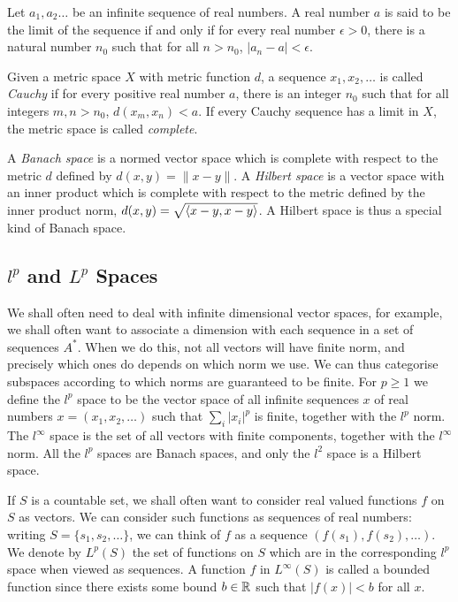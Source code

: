 \begin{defn}[Limit]
Let $a_1,a_2\ldots$ be an infinite sequence of real numbers. A real number $a$ is said to be the limit of the sequence if and only if for every real number $\epsilon > 0$, there is a natural number $n_0$ such that for all $n > n_0$, $|a_n - a| < \epsilon$.
\end{defn}

\begin{defn}[Completeness]
Given a metric space $X$ with metric function $d$, a sequence $x_1, x_2, \ldots$ is called \emph{Cauchy} if for every positive real number $a$, there is an integer $n_0$ such that for all integers $m,n > n_0$, $d(x_m,x_n) < a$. If every Cauchy sequence has a limit in $X$, the metric space is called \emph{complete}.

A \emph{Banach space} is a normed vector space which is complete with respect to the metric $d$ defined by $d(x,y) = \|x - y\|$. A \emph{Hilbert space} is a vector space with an inner product which is complete with respect to the metric defined by the inner product norm, $d(x,y) = \sqrt{\langle x-y, x-y \rangle}$. A Hilbert space is thus a special kind of Banach space.
\end{defn}

\subsection{$l^p$ and $L^p$ Spaces}
\label{lp-space-section}

We shall often need to deal with infinite dimensional vector spaces, for example, we shall often want to associate a dimension with each sequence in a set of sequences $A^*$. When we do this, not all vectors will have finite norm, and precisely which ones do depends on which norm we use. We can thus categorise subspaces according to which norms are guaranteed to be finite. For $p \ge 1$ we define the $l^p$ space to be the vector space of all infinite sequences $x$ of real numbers $x = (x_1,x_2,\ldots)$ such that $\sum_i |x_i|^p$ is finite, together with the $l^p$ norm. The $l^\infty$ space is the set of all vectors with finite components, together with the $l^\infty$ norm.
All the $l^p$ spaces are Banach spaces, and only the $l^2$ space is a Hilbert space.

If $S$ is a countable set, we shall often want to consider real valued functions $f$ on $S$ as vectors. We can consider such functions as sequences of real numbers: writing $S = \{s_1, s_2, \ldots\}$, we can think of $f$ as a sequence $(f(s_1), f(s_2), \ldots)$. We denote by $L^p(S)$  the set of functions on $S$ which are in the corresponding $l^p$ space when viewed as sequences. A function $f$ in $L^\infty(S)$ is called a bounded function since there exists some bound $b \in \mathbb{R}$ such that $|f(x)| < b$ for all $x$.

